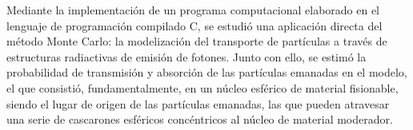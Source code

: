 
Mediante la implementación de un programa computacional elaborado en el lenguaje de programación compilado C, se estudió una aplicación directa del método Monte Carlo: la modelización del transporte de partículas a través de estructuras radiactivas de emisión de fotones. Junto con ello, se estimó la probabilidad de transmisión y absorción de las partículas emanadas en el modelo, el que consistió, fundamentalmente, en un núcleo esférico de material fisionable, siendo el lugar de origen de las partículas emanadas, las que pueden atravesar una serie de cascarones esféricos concéntricos al núcleo de material moderador.